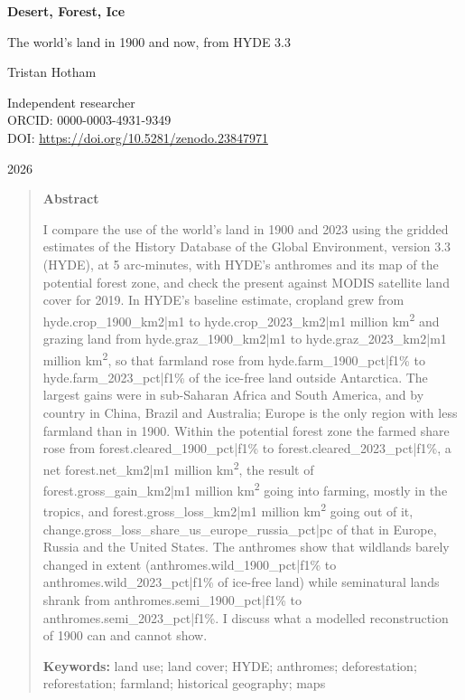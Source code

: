 \documentclass[11pt,a4paper]{article}
\begin{document}
\begin{center}
{\Large\bfseries Desert, Forest, Ice\par}
\vspace{0.4em}
{\large The world's land in 1900 and now, from HYDE 3.3\par}
\vspace{1.2em}
{\large Tristan Hotham\par}
\vspace{0.3em}
{\small Independent researcher\\
ORCID: 0000-0003-4931-9349\\
DOI: \href{https://doi.org/10.5281/zenodo.23847971}{https://doi.org/10.5281/zenodo.23847971}\par}
\vspace{0.8em}
2026
\end{center}

\begin{quote}
\small
\begin{center}\textbf{Abstract}\end{center}
I compare the use of the world's land in 1900 and 2023 using the gridded estimates of the History Database of the Global Environment, version 3.3 (HYDE), at 5 arc-minutes, with HYDE's anthromes and its map of the potential forest zone, and check the present against MODIS satellite land cover for 2019. In HYDE's baseline estimate, cropland grew from {{hyde.crop_1900_km2|m1}} to {{hyde.crop_2023_km2|m1}} million km\textsuperscript{2} and grazing land from {{hyde.graz_1900_km2|m1}} to {{hyde.graz_2023_km2|m1}} million km\textsuperscript{2}, so that farmland rose from {{hyde.farm_1900_pct|f1}}\% to {{hyde.farm_2023_pct|f1}}\% of the ice-free land outside Antarctica. The largest gains were in sub-Saharan Africa and South America, and by country in China, Brazil and Australia; Europe is the only region with less farmland than in 1900. Within the potential forest zone the farmed share rose from {{forest.cleared_1900_pct|f1}}\% to {{forest.cleared_2023_pct|f1}}\%, a net {{forest.net_km2|m1}} million km\textsuperscript{2}, the result of {{forest.gross_gain_km2|m1}} million km\textsuperscript{2} going into farming, mostly in the tropics, and {{forest.gross_loss_km2|m1}} million km\textsuperscript{2} going out of it, {{change.gross_loss_share_us_europe_russia_pct|pc}} of that in Europe, Russia and the United States. The anthromes show that wildlands barely changed in extent ({{anthromes.wild_1900_pct|f1}}\% to {{anthromes.wild_2023_pct|f1}}\% of ice-free land) while seminatural lands shrank from {{anthromes.semi_1900_pct|f1}}\% to {{anthromes.semi_2023_pct|f1}}\%. I discuss what a modelled reconstruction of 1900 can and cannot show.

\textbf{Keywords:} land use; land cover; HYDE; anthromes; deforestation; reforestation; farmland; historical geography; maps
\end{quote}
\end{document}
